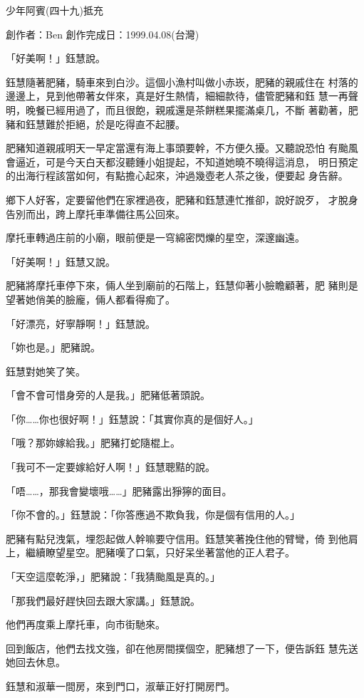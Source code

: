 



少年阿賓(四十九)抵充

創作者：Ben
創作完成日：1999.04.08(台灣)


「好美啊！」鈺慧說。

鈺慧隨著肥豬，騎車來到白沙。這個小漁村叫做小赤崁，肥豬的親戚住在
村落的邊邊上，見到他帶著女伴來，真是好生熱情，細細款待，儘管肥豬和鈺
慧一再聲明，晚餐已經用過了，而且很飽，親戚還是茶餅糕果擺滿桌几，不斷
著勸著，肥豬和鈺慧難於拒絕，於是吃得直不起腰。

肥豬知道親戚明天一早定當還有海上事頭要幹，不方便久擾。又聽說恐怕
有颱風會逼近，可是今天白天都沒聽鍾小姐提起，不知道她曉不曉得這消息，
明日預定的出海行程該當如何，有點擔心起來，沖過幾壺老人茶之後，便要起
身告辭。

鄉下人好客，定要留他們在家裡過夜，肥豬和鈺慧連忙推卻，說好說歹，
才脫身告別而出，跨上摩托車準備往馬公回來。

摩托車轉過庄前的小廟，眼前便是一穹綿密閃爍的星空，深邃幽遠。

「好美啊！」鈺慧又說。

肥豬將摩托車停下來，倆人坐到廟前的石階上，鈺慧仰著小臉瞻顧著，肥
豬則是望著她俏美的臉龐，倆人都看得痴了。

「好漂亮，好寧靜啊！」鈺慧說。

「妳也是。」肥豬說。

鈺慧對她笑了笑。

「會不會可惜身旁的人是我。」肥豬低著頭說。

「你……你也很好啊！」鈺慧說：「其實你真的是個好人。」

「哦？那妳嫁給我。」肥豬打蛇隨棍上。

「我可不一定要嫁給好人啊！」鈺慧聰黠的說。

「唔……，那我會變壞哦……」肥豬露出猙獰的面目。

「你不會的。」鈺慧說：「你答應過不欺負我，你是個有信用的人。」

肥豬有點兒洩氣，埋怨起做人幹嘛要守信用。鈺慧笑著挽住他的臂彎，倚
到他肩上，繼續瞭望星空。肥豬嘆了口氣，只好呆坐著當他的正人君子。

「天空這麼乾淨，」肥豬說：「我猜颱風是真的。」

「那我們最好趕快回去跟大家講。」鈺慧說。

他們再度乘上摩托車，向市街馳來。

回到飯店，他們去找文強，卻在他房間撲個空，肥豬想了一下，便告訴鈺
慧先送她回去休息。

鈺慧和淑華一間房，來到門口，淑華正好打開房門。


